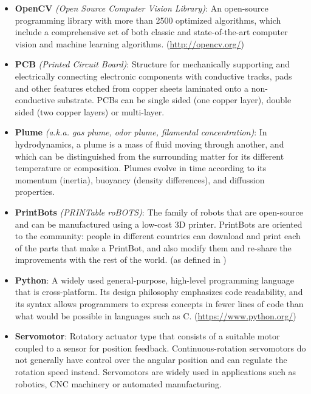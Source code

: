 \begin{itemize}
\item{\textbf{OpenCV} \emph{(Open Source Computer Vision Library)}: An open-source programming library with more than 2500 optimized algorithms, which include a comprehensive set of both classic and state-of-the-art computer vision and machine learning algorithms. (\url{http://opencv.org/})}

\item{\textbf{PCB} \emph{(Printed Circuit Board)}: Structure for mechanically supporting and electrically connecting electronic components with conductive tracks, pads and other features etched from copper sheets laminated onto a non-conductive substrate. PCBs can be single sided (one copper layer), double sided (two copper layers) or multi-layer.}

\item{\textbf{Plume} \emph{(a.k.a. gas plume, odor plume, filamental concentration)}: In hydrodynamics, a plume is a mass of fluid moving through another, and which can be distinguished from the surrounding matter for its different temperature or composition. Plumes evolve in time according to its momentum (inertia), buoyancy (density differences), and diffussion properties.}

\item{\textbf{PrintBots} \emph{(PRINTable roBOTS)}: The family of robots that are open-source and can be manufactured using a low-cost 3D printer. PrintBots are oriented to the community: people in different countries can download and print each of the parts that make a PrintBot, and also modify them and re-share the improvements with the rest of the world. (as defined in \cite{GonzalezValero11miniskybot,ValeroGonzalez12creativity,Garcia-Saura2012,ValeroGonzalezOOML12})}

\item{\textbf{Python}: A widely used general-purpose, high-level programming language that is cross-platform. Its design philosophy emphasizes code readability, and its syntax allows programmers to express concepts in fewer lines of code than what would be possible in languages such as C. (\url{https://www.python.org/})}

\item{\textbf{Servomotor}: Rotatory actuator type that consists of a suitable motor coupled to a sensor for position feedback. Continuous-rotation servomotors do not generally have control over the angular position and can regulate the rotation speed instead. Servomotors are widely used in applications such as robotics, CNC machinery or automated manufacturing.}


\end{itemize}
